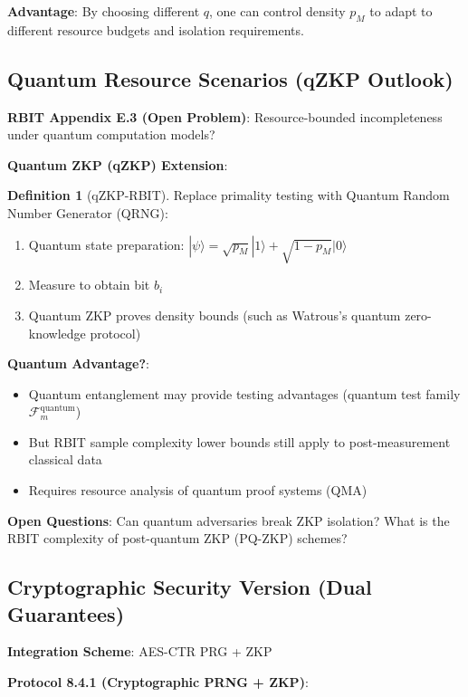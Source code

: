 \documentclass[12pt]{article}
\theoremstyle{plain}
\theoremstyle{definition}
\newtheorem{definition}[theorem]{Definition}
\begin{document}
\textbf{Advantage}: By choosing different $q$, one can control density $p_M$ to adapt to different resource budgets and isolation requirements.

\subsection{Quantum Resource Scenarios (qZKP Outlook)}

\textbf{RBIT Appendix E.3 (Open Problem)}: Resource-bounded incompleteness under quantum computation models?

\textbf{Quantum ZKP (qZKP) Extension}:

\begin{definition}[qZKP-RBIT]
Replace primality testing with Quantum Random Number Generator (QRNG):
\begin{enumerate}
\item Quantum state preparation: $|\psi\rangle = \sqrt{p_M}|1\rangle + \sqrt{1-p_M}|0\rangle$
\item Measure to obtain bit $b_i$
\item Quantum ZKP proves density bounds (such as Watrous\cite{watrous2009}'s quantum zero-knowledge protocol)
\end{enumerate}
\end{definition}

\textbf{Quantum Advantage?}:
\begin{itemize}
\item Quantum entanglement may provide testing advantages (quantum test family $\mathcal{F}_m^{\text{quantum}}$)
\item But RBIT sample complexity lower bounds still apply to post-measurement classical data
\item Requires resource analysis of quantum proof systems (QMA)
\end{itemize}

\textbf{Open Questions}: Can quantum adversaries break ZKP isolation? What is the RBIT complexity of post-quantum ZKP (PQ-ZKP) schemes?

\subsection{Cryptographic Security Version (Dual Guarantees)}

\textbf{Integration Scheme}: AES-CTR PRG + ZKP

\textbf{Protocol 8.4.1 (Cryptographic PRNG + ZKP)}:
\end{document}
